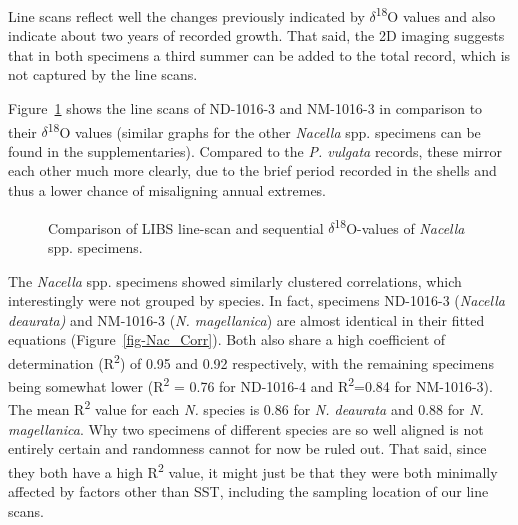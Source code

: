 \documentclass[
  authoryear,
  preprint,
  3p]{elsarticle}
\begin{document}
Line scans reflect well the changes previously indicated by
$\delta$\textsuperscript{18}O values and also indicate about two years
of recorded growth. That said, the 2D imaging suggests that in both
specimens a third summer can be added to the total record, which is not
captured by the line scans.

Figure~\ref{fig-Nac_Comp} shows the line scans of ND-1016-3 and
NM-1016-3 in comparison to their $\delta$\textsuperscript{18}O values
(similar graphs for the other \emph{Nacella} spp. specimens can be found
in the supplementaries). Compared to the \emph{P. vulgata} records,
these mirror each other much more clearly, due to the brief period
recorded in the shells and thus a lower chance of misaligning annual
extremes.

\begin{figure}


\caption{\label{fig-Nac_Comp}Comparison of LIBS line-scan and sequential
$\delta$\textsuperscript{18}O-values of \emph{Nacella} spp.
specimens.}

\end{figure}%

The \emph{Nacella} spp. specimens showed similarly clustered
correlations, which interestingly were not grouped by species. In fact,
specimens ND-1016-3 (\emph{Nacella deaurata)} and NM-1016-3 (\emph{N.
magellanica}) are almost identical in their fitted equations
(Figure~\ref{fig-Nac_Corr}). Both also share a high coefficient of
determination (R\textsuperscript{2}) of 0.95 and 0.92 respectively, with
the remaining specimens being somewhat lower (R\textsuperscript{2} =
0.76 for ND-1016-4 and R\textsuperscript{2}=0.84 for NM-1016-3). The
mean R\textsuperscript{2} value for each \emph{N.} species is 0.86 for
\emph{N. deaurata} and 0.88 for \emph{N. magellanica}. Why two specimens
of different species are so well aligned is not entirely certain and
randomness cannot for now be ruled out. That said, since they both have
a high R\textsuperscript{2} value, it might just be that they were both
minimally affected by factors other than SST, including the sampling
location of our line scans.
\end{document}

